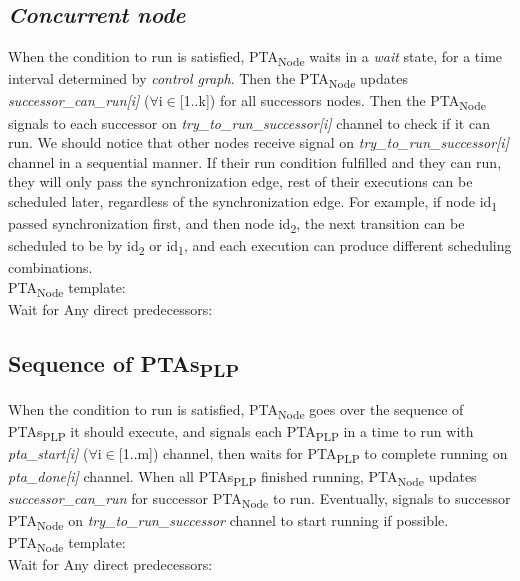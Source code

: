 \subsection{\textit{Concurrent node}}
When the condition to run is satisfied, PTA\textsubscript{Node} waits in a \textcolor{ColorUppaalState}{\textit{wait}} state, for a time interval determined by \textit{control graph}. Then the PTA\textsubscript{Node} updates \textcolor{ColorEdgeGuard}{\textit{successor_can_run[i]}} ($\forall$i$\in$[1..k]) for all successors nodes. Then the PTA\textsubscript{Node} signals to each successor on \textcolor{ColorUppaalChannel}{\textit{try_to_run_successor[i]}} channel to check if it can run. We should notice that other nodes receive signal on \textcolor{ColorUppaalChannel}{\textit{try_to_run_successor[i]}} channel in a sequential manner. If their run condition fulfilled and they can run, they will only pass the synchronization edge, rest of their executions can be scheduled later, regardless of the synchronization edge. For example, if node id\textsubscript{1} passed synchronization first, and then node id\textsubscript{2}, the next transition can be scheduled to be by id\textsubscript{2} or id\textsubscript{1}, and each execution can produce different scheduling combinations.\\
PTA\textsubscript{Node} template:\\
{Wait for Any direct predecessors: }{} \clearpage
\subsection{Sequence of PTAs\textsubscript{PLP}}
When the condition to run is satisfied, PTA\textsubscript{Node} goes over the sequence of PTAs\textsubscript{PLP} it should execute, and signals each PTA\textsubscript{PLP} in a time to run with \textcolor{ColorUppaalChannel}{\textit{pta_start[i]}} ($\forall$i$\in$[1..m]) channel, then waits for PTA\textsubscript{PLP} to complete running on \textcolor{ColorUppaalChannel}{\textit{pta_done[i]}} channel. When all PTAs\textsubscript{PLP} finished running, PTA\textsubscript{Node} updates \textcolor{ColorEdgeGuard}{\textit{successor_can_run}} for successor PTA\textsubscript{Node} to run. Eventually, signals to successor PTA\textsubscript{Node} on \textcolor{ColorUppaalChannel}{\textit{try_to_run_successor}} channel to start running if possible.\\
PTA\textsubscript{Node} template:\\
 {Wait for Any direct predecessors: }{} \clearpage
